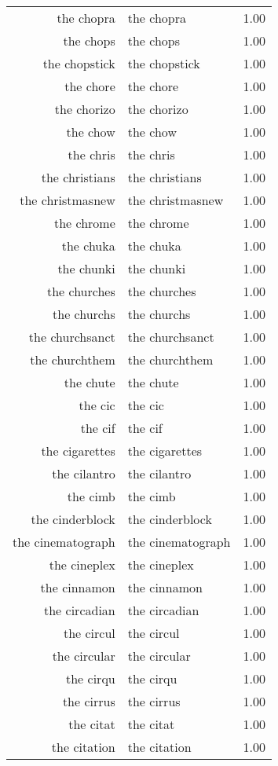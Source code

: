 \begin{table}[ht]
\begin{tabular}{rlr}
  the chopra & the chopra & 1.00 \\ 
  the chops & the chops & 1.00 \\ 
  the chopstick & the chopstick & 1.00 \\ 
  the chore & the chore & 1.00 \\ 
  the chorizo & the chorizo & 1.00 \\ 
  the chow & the chow & 1.00 \\ 
  the chris & the chris & 1.00 \\ 
  the christians & the christians & 1.00 \\ 
  the christmasnew & the christmasnew & 1.00 \\ 
  the chrome & the chrome & 1.00 \\ 
  the chuka & the chuka & 1.00 \\ 
  the chunki & the chunki & 1.00 \\ 
  the churches & the churches & 1.00 \\ 
  the churchs & the churchs & 1.00 \\ 
  the churchsanct & the churchsanct & 1.00 \\ 
  the churchthem & the churchthem & 1.00 \\ 
  the chute & the chute & 1.00 \\ 
  the cic & the cic & 1.00 \\ 
  the cif & the cif & 1.00 \\ 
  the cigarettes & the cigarettes & 1.00 \\ 
  the cilantro & the cilantro & 1.00 \\ 
  the cimb & the cimb & 1.00 \\ 
  the cinderblock & the cinderblock & 1.00 \\ 
  the cinematograph & the cinematograph & 1.00 \\ 
  the cineplex & the cineplex & 1.00 \\ 
  the cinnamon & the cinnamon & 1.00 \\ 
  the circadian & the circadian & 1.00 \\ 
  the circul & the circul & 1.00 \\ 
  the circular & the circular & 1.00 \\ 
  the cirqu & the cirqu & 1.00 \\ 
  the cirrus & the cirrus & 1.00 \\ 
  the citat & the citat & 1.00 \\ 
  the citation & the citation & 1.00 \\ 

\end{tabular}
\end{table}
